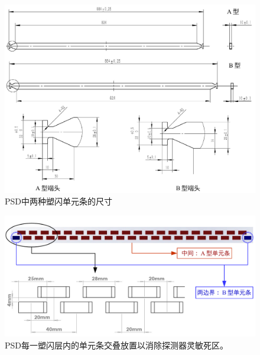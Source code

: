 \begin{figure}
\centering
\includegraphics[width=\linewidth]{chap/description/fig/bars}
\caption{PSD中两种塑闪单元条的尺寸}
\label{fig:ch2:bars}
\end{figure}

\begin{figure}
\centering
\includegraphics[width=1\linewidth]{chap/description/fig/bars_layout}
\caption{PSD每一塑闪层内的单元条交叠放置以消除探测器灵敏死区。}
\label{fig:ch2:bars_layout}
\end{figure}

